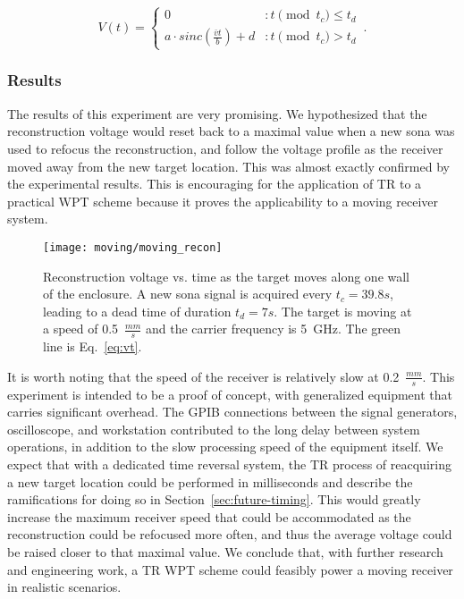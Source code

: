 \begin{equation}\label{eq:vt}
  V(t) = \left\{
        \begin{array}{ll}
                0 & : t\pmod{t_c} \le t_d \\
                a\cdot sinc(\frac{\bar{v}t}{b})+d & : t\pmod{t_c} > t_d
        \end{array}\,.
  \right.
\end{equation}

\subsubsection{Results}
\label{moving-results}

The results of this experiment are very promising. We hypothesized that the reconstruction \ptp{} voltage would reset back to a maximal value when a new sona was used to refocus the reconstruction, and follow the voltage profile as the receiver moved away from the new target location. This was almost exactly confirmed by the experimental results. This is encouraging for the application of TR to a practical WPT scheme because it proves the applicability to a moving receiver system.

\begin{figure}[t]
\centering
\texttt{[image: moving/moving\_recon]}
    \caption[\Ptp{} voltage of moving reconstructions]{Reconstruction \ptp{} voltage vs. time as the target moves along one wall of the enclosure. A new sona signal is acquired every $t_c = 39.8s$, leading to a dead time of duration $t_d = 7s$. The target is moving at a speed of 0.5~$\frac{mm}{s}$ and the carrier frequency is 5~GHz. The green line is Eq.~\ref{eq:vt}.}
    \label{fig:moving-recon}
\end{figure}

It is worth noting that the speed of the receiver is relatively slow at 0.2~$\frac{mm}{s}$. This experiment is intended to be a proof of concept, with generalized equipment that carries significant overhead. The GPIB connections between the signal generators, oscilloscope, and workstation contributed to the long delay between system operations, in addition to the slow processing speed of the equipment itself. We expect that with a dedicated time reversal system, the TR process of reacquiring a new target location could be performed in milliseconds and describe the ramifications for doing so in Section~\ref{sec:future-timing}. This would greatly increase the maximum receiver speed that could be accommodated as the reconstruction could be refocused more often, and thus the average \ptp{} voltage could be raised closer to that maximal value. We conclude that, with further research and engineering work, a TR WPT scheme could feasibly power a moving receiver in realistic scenarios.

